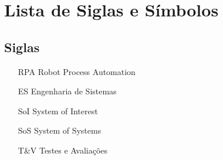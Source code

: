 
\newpage
\chapter*{Lista de Siglas e Símbolos} %

	\section*{Siglas}
	
		\begin{itemize}[labelwidth=5em,leftmargin=\dimexpr{}+\relax,align=left]
			\item[RPA] Robot Process Automation
			\item[ES] Engenharia de Sistemas
			\item[SoI] System of Interest
			\item[SoS] System of Systems
			\item[T\&V] Testes e Avaliações
		\end{itemize}
	
		\thispagestyle{empty}

	
	
	
	
	